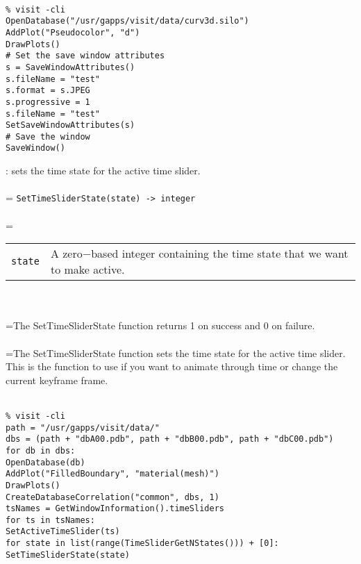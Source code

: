 \documentclass[10pt,a4paper]{report}
\begin{document}
\\[-6mm]
\begin{verbatim}% visit -cli
OpenDatabase("/usr/gapps/visit/data/curv3d.silo")
AddPlot("Pseudocolor", "d")
DrawPlots()
# Set the save window attributes
s = SaveWindowAttributes()
s.fileName = "test"
s.format = s.JPEG
s.progressive = 1
s.fileName = "test"
SetSaveWindowAttributes(s)
# Save the window
SaveWindow()
\end{verbatim}
\newpage


{}
: sets the time state for the active time slider.\\[-3mm]

 \\ 
\hangindent=\parindent 
\verb!SetTimeSliderState(state) -> integer!\\ [-3mm]

 \\ 
\hangindent=\parindent 
\begin{tabular}{lp{9cm}}
\verb!state! & A zero$-$based integer containing the time state that we want to make active. \\
\end{tabular} \\[-2mm]


 \\ 
\hangindent=\parindent The SetTimeSliderState function returns 1 on success and 0 on failure. \\[-3mm] 

 \\ 
\hangindent=\parindent The SetTimeSliderState function sets the time state for the active time slider. This is the function to use if you want to animate through time or change the current keyframe frame. \\[-3mm] 

\\[-6mm]
\begin{verbatim}% visit -cli
path = "/usr/gapps/visit/data/"
dbs = (path + "dbA00.pdb", path + "dbB00.pdb", path + "dbC00.pdb")
for db in dbs:
OpenDatabase(db)
AddPlot("FilledBoundary", "material(mesh)")
DrawPlots()
CreateDatabaseCorrelation("common", dbs, 1)
tsNames = GetWindowInformation().timeSliders
for ts in tsNames:
SetActiveTimeSlider(ts)
for state in list(range(TimeSliderGetNStates())) + [0]:
SetTimeSliderState(state)
\end{verbatim}
\newpage
\end{document}

